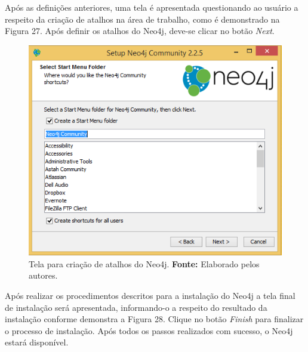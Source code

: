\par Após as definições anteriores, uma tela é apresentada questionando ao usuário a respeito da criação de atalhos na área de trabalho, como é demonstrado na Figura 27. Após definir os atalhos do Neo4j, deve-se clicar no botão \textit{Next}.

\begin{figure}[h!]
	\centerline{\includegraphics[scale=0.4]{./imagens/neo4j-install-step4.png}}
	\caption[Tela para criação de atalhos do Neo4j]
	{Tela para criação de atalhos do Neo4j. \textbf{Fonte:} Elaborado pelos autores.}
	\label{fig:exemplo1}
\end{figure}

\par Após realizar os procedimentos descritos para a instalação do Neo4j a tela final de instalação será apresentada, informando-o a respeito do resultado da instalação conforme demonstra a Figura 28. Clique no botão \textit{Finish} para finalizar o processo de instalação.
Após todos os passos realizados com sucesso, o Neo4j estará disponível.

